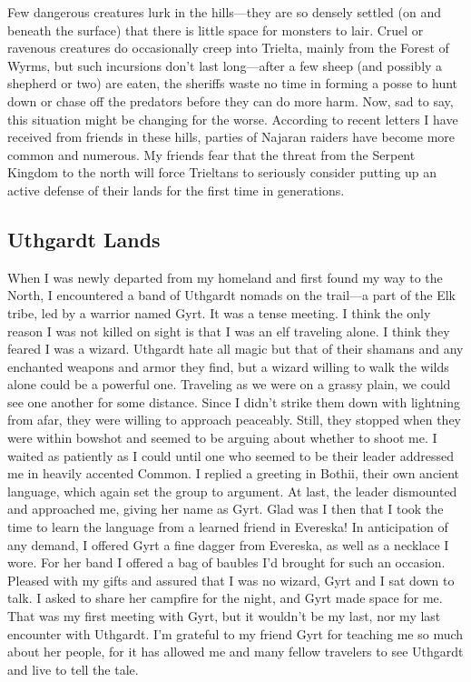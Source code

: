 \documentclass[10pt,a4paper,twoside,twocolumn,openany,bg=print,nodeprecatedcode]{dndbook}
\begin{document}
Few dangerous creatures lurk in the hills—they are so densely settled (on and beneath the surface) that there is little space for monsters to lair. Cruel or ravenous creatures do occasionally creep into Trielta, mainly from the Forest of Wyrms, but such incursions don't last long—after a few sheep (and possibly a shepherd or two) are eaten, the sheriffs waste no time in forming a posse to hunt down or chase off the predators before they can do more harm.
Now, sad to say, this situation might be changing for the worse. According to recent letters I have received from friends in these hills, parties of Najaran raiders have become more common and numerous. My friends fear that the threat from the Serpent Kingdom to the north will force Trieltans to seriously consider putting up an active defense of their lands for the first time in generations.
\subsection{Uthgardt Lands}
When I was newly departed from my homeland and first found my way to the North, I encountered a band of Uthgardt nomads on the trail—a part of the Elk tribe, led by a warrior named Gyrt. It was a tense meeting.
I think the only reason I was not killed on sight is that I was an elf traveling alone. I think they feared I was a wizard. Uthgardt hate all magic but that of their shamans and any enchanted weapons and armor they find, but a wizard willing to walk the wilds alone could be a powerful one. Traveling as we were on a grassy plain, we could see one another for some distance. Since I didn't strike them down with lightning from afar, they were willing to approach peaceably.
Still, they stopped when they were within bowshot and seemed to be arguing about whether to shoot me. I waited as patiently as I could until one who seemed to be their leader addressed me in heavily accented Common. I replied a greeting in Bothii, their own ancient language, which again set the group to argument. At last, the leader dismounted and approached me, giving her name as Gyrt. Glad was I then that I took the time to learn the language from a learned friend in Evereska!
In anticipation of any demand, I offered Gyrt a fine dagger from Evereska, as well as a necklace I wore. For her band I offered a bag of baubles I'd brought for such an occasion. Pleased with my gifts and assured that I was no wizard, Gyrt and I sat down to talk. I asked to share her campfire for the night, and Gyrt made space for me. That was my first meeting with Gyrt, but it wouldn't be my last, nor my last encounter with Uthgardt. I'm grateful to my friend Gyrt for teaching me so much about her people, for it has allowed me and many fellow travelers to see Uthgardt and live to tell the tale.
\end{document}
